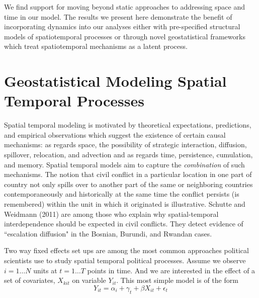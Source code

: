 \documentclass[12pt]{article}
\begin{document}
We find support for moving beyond static approaches to addressing space and time in our model. The results we present here demonstrate the benefit of incorporating dynamics into our analyses either with pre-specified structural models of spatiotemporal processes or through novel geostatistical frameworks which treat spatiotemporal mechanisms as a latent process.



\section{Geostatistical Modeling Spatial Temporal Processes}
Spatial temporal modeling is motivated by theoretical expectations, predictions, and empirical observations which suggest the existence of certain causal mechanisms: as regards space, the possibility
of strategic interaction, diffusion, spillover, relocation, and advection and as regards time, persistence,
cumulation, and memory. Spatial temporal models aim to capture the \emph{combination} of
such mechanisms. The notion that civil conflict in a particular location in one part of country not only
spills over to another part of the same or neighboring countries contemporaneously and
historically at the same time the conflict persists (is remembered) within the unit in
which it originated is illustrative. Schutte and Weidmann (2011) are among those who explain why
spatial-temporal interdependence should be expected in civil conflicts. They detect evidence
of ``escalation diffusion" in the Bosnian, Burundi, and Rwandan cases.

Two way fixed effects set ups are among the most common approaches political scientists use
to study spatial temporal political processes. Assume we observe $i = 1 \dots N$ units at $t= 1 \dots T$ points
in time. And we are interested in the effect of a set of covariates, $X_{kit}$ on variable $Y_{it}$.
This most simple model is of the form
\begin{equation}
Y_{it} = \alpha_i + \gamma_t + \beta X_{it} + \epsilon_t
\end{equation}
\end{document}

